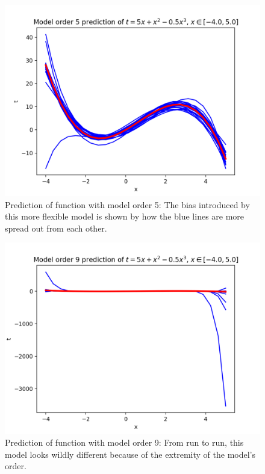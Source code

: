 \documentclass[10pt]{article}
\begin{document}
\begin{itemize}
\begin{figure}[H]
\centering
  \includegraphics[width=\linewidth]{model_bias-5.png}
 \caption{Prediction of function with model order 5: The bias introduced by this more flexible model is shown by how the blue lines are more spread out from each other.}
\label{label}
\end{figure}

\begin{figure}[H]
\centering
  \includegraphics[width=\linewidth]{model_bias-9.png}
 \caption{Prediction of function with model order 9: From run to run, this model looks wildly different because of the extremity of the model's order. }
\label{label}
\end{figure}


\end{itemize}
\end{document}
